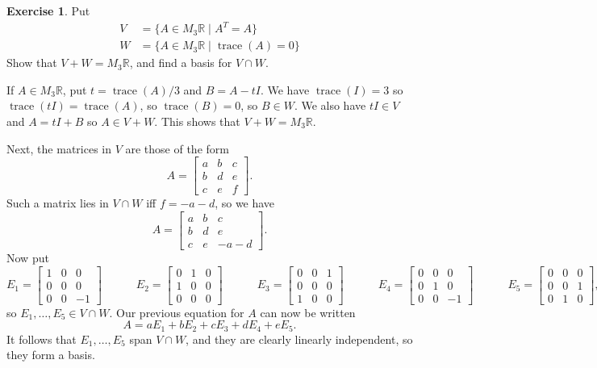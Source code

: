 \documentclass{amsart}
\newcommand{\R}         {{\mathbb{R}}}
\newcommand{\bpm}       {\left[\begin{matrix}}
\newcommand{\epm}       {\end{matrix}\right]}
\newcommand{\st}        {\;|\;}
\newcommand{\trace}     {\operatorname{trace}}
\renewcommand{\:}{\colon}
\theoremstyle{definition}
\newtheorem{exercise}{Exercise}
\newenvironment{solution}{{\noindent \bf Solution:}}{}
\begin{document}
\begin{exercise}
 Put 
 \begin{align*}
  V &= \{A\in M_3\R\st A^T=A\} \\
  W &= \{A\in M_3\R\st \trace(A)=0\}
 \end{align*}
 Show that $V+W=M_3\R$, and find a basis for $V\cap W$.  
\end{exercise}
\begin{solution}
 If $A\in M_3\R$, put $t=\trace(A)/3$ and $B=A-tI$.  We have
 $\trace(I)=3$ so $\trace(tI)=\trace(A)$, so $\trace(B)=0$,
 so $B\in W$.  We also have $tI\in V$ and $A=tI+B$ so
 $A\in V+W$.  This shows that $V+W=M_3\R$.

 Next, the matrices in $V$ are those of the form
 \[ A = \bpm a & b & c \\
             b & d & e \\
             c & e & f \epm.
 \]
 Such a matrix lies in $V\cap W$ iff $f=-a-d$, so we have
 \[ A = \bpm a & b & c \\
             b & d & e \\
             c & e & -a-d \epm.
 \]
 Now put
 {\tiny \[
  E_1 = \bpm 1&0&0\\0&0&0\\0&0&-1 \epm \hspace{3em}
  E_2 = \bpm 0&1&0\\1&0&0\\0&0&0 \epm \hspace{3em}
  E_3 = \bpm 0&0&1\\0&0&0\\1&0&0 \epm \hspace{3em}
  E_4 = \bpm 0&0&0\\0&1&0\\0&0&-1 \epm \hspace{3em}
  E_5 = \bpm 0&0&0\\0&0&1\\0&1&0 \epm,
 \]}
 so $E_1,\dotsc,E_5\in V\cap W$.  Our previous equation for
 $A$ can now be written 
 \[ A = aE_1 + bE_2 + cE_3 + dE_4 + eE_5. \]
 It follows that $E_1,\dotsc,E_5$ span $V\cap W$, and they
 are clearly linearly independent, so they form a basis. 
\end{solution}

\end{document}
